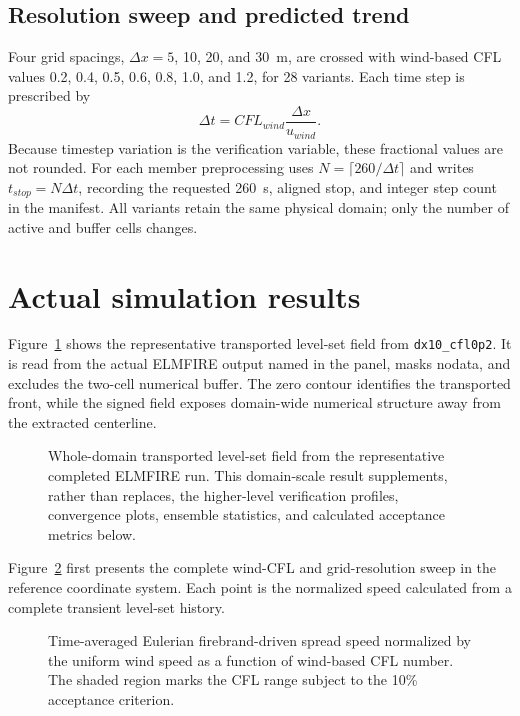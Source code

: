 \subsection{Resolution sweep and predicted trend}
Four grid spacings, $\Delta x=5$, 10, 20, and \SI{30}{m}, are crossed with
wind-based CFL values 0.2, 0.4, 0.5, 0.6, 0.8, 1.0, and 1.2, for 28 variants.  Each
time step is prescribed by
\begin{equation}
  \Delta t=CFL_{wind}\frac{\Delta x}{u_{wind}}.
\end{equation}
Because timestep variation is the verification variable, these fractional values are not rounded. For each member preprocessing uses \(N=\lceil260/\Delta t\rceil\) and writes \(t_{stop}=N\Delta t\), recording the requested 260~s, aligned stop, and integer step count in the manifest. All variants retain the same physical domain; only the number of active and
buffer cells changes.

\section{Actual simulation results}

Figure~\ref{fig:domain-result} shows the representative transported level-set field from \texttt{dx10\_cfl0p2}.
It is read from the actual ELMFIRE output named in the panel, masks nodata, and excludes
the two-cell numerical buffer.  The zero contour identifies the transported front, while the signed field exposes domain-wide numerical structure away from the extracted centerline.

\begin{figure}[H]
\centering
{}
\caption{Whole-domain transported level-set field from the representative completed ELMFIRE run.  This
domain-scale result supplements, rather than replaces, the higher-level verification
profiles, convergence plots, ensemble statistics, and calculated acceptance metrics below.}
\label{fig:domain-result}
\end{figure}

Figure~\ref{fig:transport-convergence} first presents the complete wind-CFL
and grid-resolution sweep in the reference coordinate system. Each point is
the normalized speed calculated from a complete transient level-set history.
\begin{figure}[H]
  \centering
  \caption{Time-averaged Eulerian firebrand-driven spread speed normalized by
  the uniform wind speed as a function of wind-based CFL number. The shaded
  region marks the CFL range subject to the 10\% acceptance criterion.}
  \label{fig:transport-convergence}
\end{figure}

